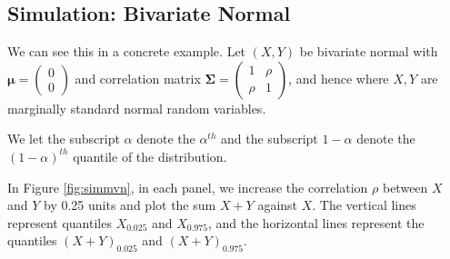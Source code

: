 \documentclass[12pt,twoside]{smiththesis}
\begin{document}
\newpage

\hypertarget{simulation-bivariate-normal}{%
\subsection{Simulation: Bivariate Normal}\label{simulation-bivariate-normal}}

We can see this in a concrete example. Let \((X,Y)\) be bivariate normal with \(\boldsymbol \mu = \begin{pmatrix} 0\\0\end{pmatrix}\) and correlation matrix \(\boldsymbol \Sigma = \begin{pmatrix} 1 & \rho \\ \rho & 1 \end{pmatrix}\), and hence where \(X, Y\) are marginally standard normal random variables.

We let the subscript \(\alpha\) denote the \(\alpha^{th}\) and the subscript \(1-\alpha\) denote the \((1-\alpha)^{th}\) quantile of the distribution.

In Figure \ref{fig:simmvn}, in each panel, we increase the correlation \(\rho\) between \(X\) and \(Y\) by 0.25 units and plot the sum \(X +Y\) against \(X\). The vertical lines represent quantiles \(X_{0.025}\) and \(X_{0.975}\), and the horizontal lines represent the quantiles \((X+Y)_{0.025}\) and \((X+Y)_{0.975}\).
\end{document}
